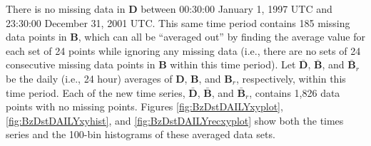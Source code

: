 There is no missing data in $\mathbf{D}$ between 00:30:00 January 1, 1997 UTC and 23:30:00 December 31, 2001 UTC.  This same time period contains 185 missing data points in $\mathbf{B}$, which can all be ``averaged out'' by finding the average value for each set of 24 points while ignoring any missing data (i.e., there are no sets of 24 consecutive missing data points in $\mathbf{B}$ within this time period).  Let $\bar{\mathbf{D}}$, $\bar{\mathbf{B}}$, and $\bar{\mathbf{B}}_r$ be the daily (i.e., 24 hour) averages of $\mathbf{D}$, $\mathbf{B}$, and $\mathbf{B}_r$, respectively, within this time period.  Each of the new time series, $\bar{\mathbf{D}}$, $\bar{\mathbf{B}}$, and $\bar{\mathbf{B}}_r$, contains 1,826 data points with no missing points.  Figures \ref{fig:BzDstDAILYxyplot}, \ref{fig:BzDstDAILYxyhist}, and \ref{fig:BzDstDAILYrecxyplot} show both the times series and the 100-bin histograms of these averaged data sets.
